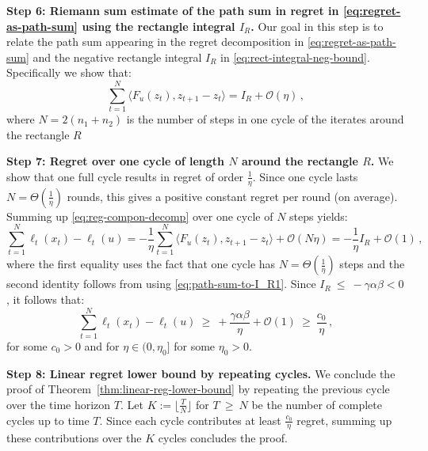 \documentclass[a4paper,11pt,fullpage]{article}
\theoremstyle{plain}
\theoremstyle{definition}
\theoremstyle{plain}
\renewcommand{\leq}{~\le~}
\renewcommand{\geq}{~\ge~}
\begin{document}
\noindent\textbf{Step 6: Riemann sum estimate of the path sum in regret in \eqref{eq:regret-as-path-sum} using the rectangle integral $I_R$.} 
Our goal in this step is to relate the path sum appearing in the regret decomposition in \eqref{eq:regret-as-path-sum} 
and the negative rectangle integral $I_R$ in \eqref{eq:rect-integral-neg-bound}. Specifically we show that: 
\begin{equation}
    \label{eq:path-sum-to-I_R1}
    \sum_{t=1}^N \langle F_u(z_t), z_{t+1} - z_t \rangle = I_R + \mathcal{O}(\eta)\,,
    \end{equation}
    where $N = 2(n_1 + n_2)$ is the number of steps in one cycle of the iterates around the rectangle $R$ 

\noindent\textbf{Step 7: Regret over one cycle of length $N$ around the rectangle $R$.} 
We show that one full cycle results in regret of order $\frac{1}{\eta}$. 
Since one cycle lasts $N = \Theta(\frac{1}{\eta})$ rounds, this gives a positive constant regret per round (on average).
Summing up \eqref{eq:reg-compon-decomp} over one cycle of $N$ steps yields: 
    \begin{equation}
    \label{eq:path-sum-to-I_R2}
    \sum_{t=1}^N \ell_t(x_t) - \ell_t(u) = - \frac{1}{\eta} \sum_{t=1}^N \langle F_u(z_t), z_{t+1} - z_t \rangle + \mathcal{O}(N \eta)
    = - \frac{1}{\eta} I_R + \mathcal{O}(1)\,, 
    \end{equation}
    where the first equality uses the fact that one cycle has $N = \Theta(\frac{1}{\eta})$ steps 
    and the second identity follows from using \eqref{eq:path-sum-to-I_R1}. 
    Since $I_R \leq - \gamma \alpha \beta < 0$, it follows that: 
    \begin{equation}
        \label{eq:1-cycle-lower-bound}
    \sum_{t=1}^N \ell_t(x_t) - \ell_t(u) \geq + \frac{\gamma \alpha \beta} {\eta} + \mathcal{O}(1) \geq \frac{c_0}{\eta}\,, 
    \end{equation}
    for some $c_0 > 0$ and for $\eta \in (0, \eta_0]$ for some $\eta_0 > 0$. 
    
    \noindent\textbf{Step 8: Linear regret lower bound by repeating cycles.} 
    We conclude the proof of Theorem~\ref{thm:linear-reg-lower-bound} by repeating the previous cycle over the time horizon $T$. 
    Let $K := \lfloor \frac{T}{N} \rfloor$ for $T \geq N$  be the number of complete cycles up to time $T$. 
    Since each cycle contributes at least $\frac{c_0}{\eta}$ regret, summing up these contributions over the $K$ cycles concludes the proof.   
\end{document}
